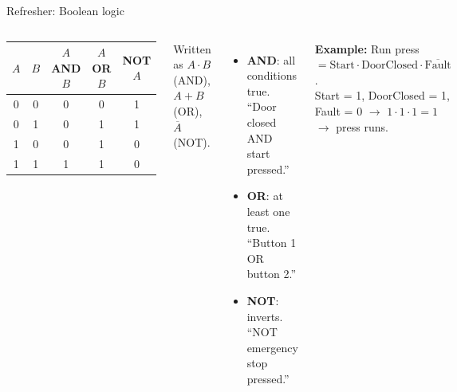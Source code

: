 \documentclass[aspectratio=169,10pt]{beamer}
\begin{document}
\begin{frame}[t]{Refresher: Boolean logic}
\begin{columns}[T,onlytextwidth]
\begin{defbox}
\small
\begin{tabular}{@{}cc|ccc@{}}
$A$ & $B$ & $A$ AND $B$ & $A$ OR $B$ & NOT $A$\\
\midrule
0 & 0 & 0 & 0 & 1\\
0 & 1 & 0 & 1 & 1\\
1 & 0 & 0 & 1 & 0\\
1 & 1 & 1 & 1 & 0\\
\end{tabular}
\end{defbox}
\small Written as $A\cdot B$ (AND), $A+B$ (OR), $\overline{A}$ (NOT).
\begin{itemize}\small
\item \textbf{AND}: all conditions true. ``Door closed AND start pressed.''
\item \textbf{OR}: at least one true. ``Button 1 OR button 2.''
\item \textbf{NOT}: inverts. ``NOT emergency stop pressed.''
\end{itemize}
\vspace{1mm}
\begin{notebox}
\textbf{Example:} Run press $= \text{Start}\cdot\text{DoorClosed}\cdot\overline{\text{Fault}}$.\\
Start = 1, DoorClosed = 1, Fault = 0 $\to$ $1\cdot1\cdot1 = 1$ $\to$ press runs.
\end{notebox}
\end{columns}
\end{frame}
\end{document}
